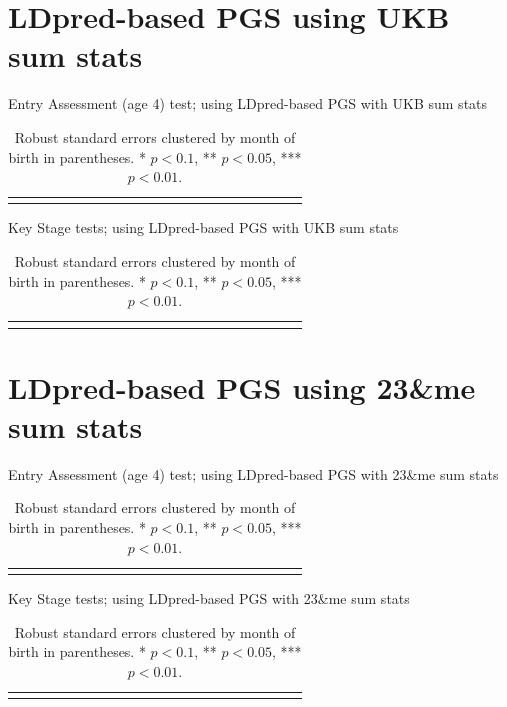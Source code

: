 \documentclass{article}
\begin{document}
\clearpage

\section{LDpred-based PGS using UKB sum stats}

\begin{table}[H]
\caption{Entry Assessment (age 4) test; using LDpred-based PGS with UKB sum stats}
\centering
{\scriptsize
\begin{tabular}{lcccccccccccccccccccc}
\toprule

\bottomrule
\addlinespace[.75ex]
\end{tabular}
}
\caption*{\noindent\scriptsize Robust standard errors clustered by month of birth in parentheses. * $p < 0.1$, ** $p < 0.05$, *** $p < 0.01$.}
\end{table}

\begin{table}[H]
\caption{Key Stage tests; using LDpred-based PGS with UKB sum stats}
\centering
{\scriptsize
\begin{tabular}{lcccccccccccccccccccc}
\toprule

\bottomrule
\addlinespace[.75ex]
\end{tabular}
}
\caption*{\noindent\scriptsize Robust standard errors clustered by month of birth in parentheses. * $p < 0.1$, ** $p < 0.05$, *** $p < 0.01$.}
\end{table}


\clearpage

\section{LDpred-based PGS using 23\&me sum stats}

\begin{table}[H]
\caption{Entry Assessment (age 4) test; using LDpred-based PGS with 23\&me sum stats}
\centering
{\scriptsize
\begin{tabular}{lcccccccccccccccccccc}
\toprule

\bottomrule
\addlinespace[.75ex]
\end{tabular}
}
\caption*{\noindent\scriptsize Robust standard errors clustered by month of birth in parentheses. * $p < 0.1$, ** $p < 0.05$, *** $p < 0.01$.}
\end{table}

\begin{table}[H]
\caption{Key Stage tests; using LDpred-based PGS with 23\&me sum stats}
\centering
{\scriptsize
\begin{tabular}{lcccccccccccccccccccc}
\toprule

\bottomrule
\addlinespace[.75ex]
\end{tabular}
}
\caption*{\noindent\scriptsize Robust standard errors clustered by month of birth in parentheses. * $p < 0.1$, ** $p < 0.05$, *** $p < 0.01$.}
\end{table}
\end{document}
